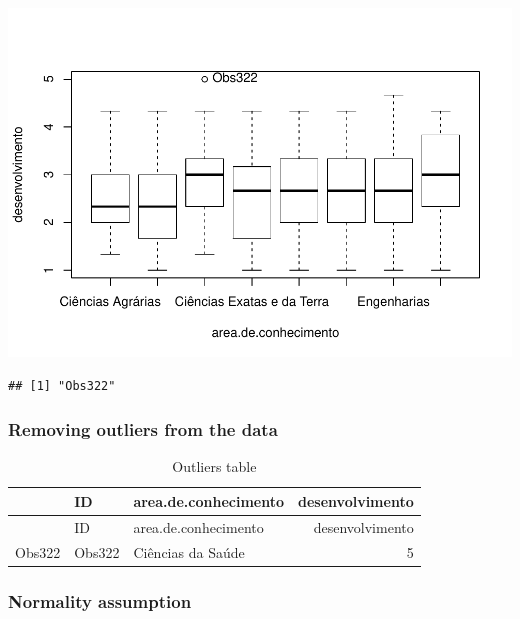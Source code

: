 \documentclass[]{article}
\newenvironment{Shaded}{\begin{snugshade}}{\end{snugshade}}
\newcommand{\CommentTok}[1]{\textcolor[rgb]{0.56,0.35,0.01}{\textit{#1}}}
\newcommand{\KeywordTok}[1]{\textcolor[rgb]{0.13,0.29,0.53}{\textbf{#1}}}
\newcommand{\NormalTok}[1]{#1}
\newcommand{\OperatorTok}[1]{\textcolor[rgb]{0.81,0.36,0.00}{\textbf{#1}}}
\newcommand{\StringTok}[1]{\textcolor[rgb]{0.31,0.60,0.02}{#1}}
\begin{document}
\includegraphics{factorialAnova_files/figure-latex/unnamed-chunk-3-1.pdf}

\begin{verbatim}
## [1] "Obs322"
\end{verbatim}

\hypertarget{removing-outliers-from-the-data}{%
\subsubsection{Removing outliers from the
data}\label{removing-outliers-from-the-data}}

\begin{Shaded}
\end{Shaded}

\begin{longtable}[]{@{}lllr@{}}
\caption{Outliers table}\tabularnewline
\toprule
& ID & area.de.conhecimento & desenvolvimento\tabularnewline
\midrule
\endfirsthead
\toprule
& ID & area.de.conhecimento & desenvolvimento\tabularnewline
\midrule
\endhead
Obs322 & Obs322 & Ciências da Saúde & 5\tabularnewline
\bottomrule
\end{longtable}

\hypertarget{normality-assumption}{%
\subsubsection{Normality assumption}\label{normality-assumption}}
\end{document}
